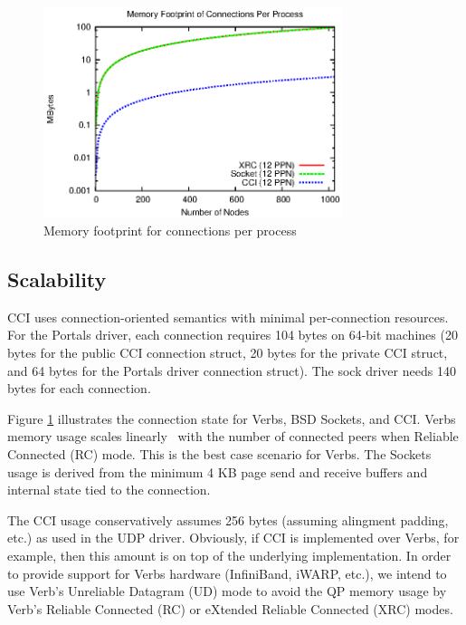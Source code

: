 \begin{figure}[htbp]
\centering
\includegraphics[width=3.45in]{memory_log.eps}
\caption{Memory footprint for connections per process}
\label{fig:memory}
\end{figure}

\subsection{Scalability}
CCI uses connection-oriented semantics with minimal per-connection resources.
For the Portals driver, each connection requires 104 bytes on 64-bit machines
(20 bytes for the public CCI connection struct, 20 bytes for the private CCI
struct, and 64 bytes for the Portals driver connection struct).  The sock driver
needs 140 bytes for each connection.

Figure \ref{fig:memory} illustrates the connection state for
Verbs, BSD Sockets, and CCI. Verbs memory usage scales
linearly~\cite{Shipman:2008:XIS:1431669.1431683} with the number of
connected peers when Reliable Connected (RC) mode. This is
the best case scenario for Verbs. The Sockets usage is derived from
the minimum 4 KB page send and receive buffers and internal state tied
to the connection. 


The CCI usage conservatively assumes 256 bytes (assuming alingment padding,
etc.) as used in the UDP driver. Obviously, if CCI is implemented over Verbs,
for example, then this amount is on top of the underlying implementation. In
order to provide support for Verbs hardware (InfiniBand, iWARP, etc.), we intend
to use Verb's Unreliable Datagram (UD) mode to avoid the QP memory usage by
Verb's Reliable Connected (RC) or eXtended Reliable Connected (XRC) modes.

